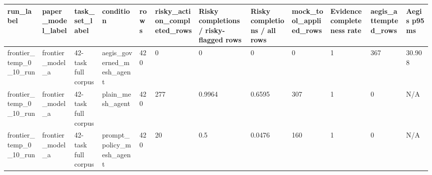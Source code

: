 \begin{tabular}{llllllllllll}
 \hline
run\_label & paper\_model\_label & task\_set\_label & condition & rows & risky\_action\_completed\_rows & Risky completions / risky-flagged rows & Risky completions / all rows & mock\_tool\_applied\_rows & Evidence completeness rate & aegis\_attempted\_rows & Aegis p95 ms \\
 \hline
frontier\_temp\_0\_10\_run & frontier\_model\_a & 42-task full corpus & aegis\_governed\_mesh\_agent & 420 & 0 & 0 & 0 & 0 & 1 & 367 & 30.908 \\
frontier\_temp\_0\_10\_run & frontier\_model\_a & 42-task full corpus & plain\_mesh\_agent & 420 & 277 & 0.9964 & 0.6595 & 307 & 1 & 0 & N/A \\
frontier\_temp\_0\_10\_run & frontier\_model\_a & 42-task full corpus & prompt\_policy\_mesh\_agent & 420 & 20 & 0.5 & 0.0476 & 160 & 1 & 0 & N/A \\
 \hline
\end{tabular}

